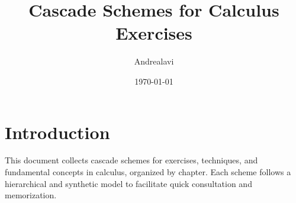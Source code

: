 \documentclass[11pt,a4paper]{article}
\title{Cascade Schemes for Calculus Exercises}
\author{Andrealavi}
\date{\today}
\begin{document}
\maketitle
\clearpage
\tableofcontents
\newpage

\section*{Introduction}
This document collects cascade schemes for exercises, techniques, and fundamental concepts in calculus, organized by chapter. Each scheme follows a hierarchical and synthetic model to facilitate quick consultation and memorization.






\end{document}
